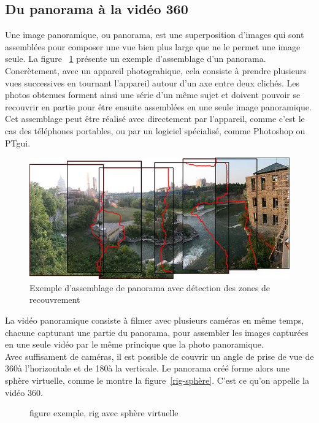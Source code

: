\subsection{Du panorama à la vidéo 360}
Une image panoramique, ou panorama, est une superposition d'images qui sont assemblées
pour composer une vue bien plus large que ne le permet une image seule. La figure~ 
\ref{RochesterNY} présente un exemple d'assemblage d'un panorama.\\
Concrètement, avec un appareil photograhique, cela consiste à prendre plusieurs vues
successives en tournant l'appareil autour d'un axe entre deux clichés. 
Les photos obtenues forment ainsi une série d'un même sujet et doivent pouvoir 
se recouvrir en partie pour être ensuite assemblées en une seule image panoramique. 
Cet assemblage peut être réalisé avec directement par l'appareil, comme c'est le cas des 
téléphones portables, ou par un logiciel spécialisé, comme Photoshop\cite{photomerge} 
ou PTgui\cite{PTgui}.
\begin{figure}
  \centering
  \includegraphics[width=12cm]{images/RochesterNY.jpg}
  \caption{Exemple d'assemblage de panorama avec détection des zones de recouvrement\cite{RochesterNY}}
  \label{RochesterNY}
\end{figure}
\newline
La vidéo panoramique consiste à filmer avec plusieurs caméras en même temps, chacune
capturant une partie du panorama, pour assembler les images capturées en une seule
vidéo par le même princique que la photo panoramique.\\
Avec suffisament de caméras, il est possible de couvrir un angle de prise de vue 
de 360\degree à l'horizontale et de 180\degree à la verticale. Le panorama créé
forme alors une sphère virtuelle, comme le montre la figure~\ref{rig-sphère}. 
C'est ce qu'on appelle la vidéo 360.
\begin{figure}
  \centering
  figure exemple, rig avec sphère virtuelle
\end{figure}
